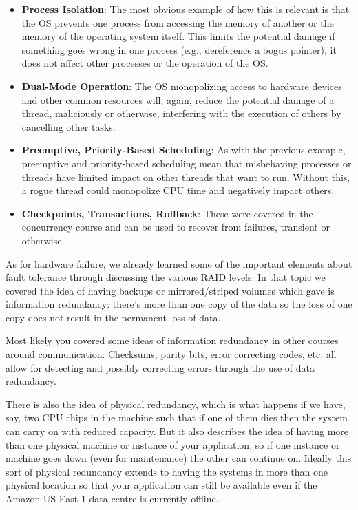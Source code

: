 \begin{itemize}

	\item \textbf{Process Isolation}: The most obvious example of how this is relevant is that the OS prevents one process from accessing the memory of another or the memory of the operating system itself. This limits the potential damage if something goes wrong in one process (e.g., dereference a bogus pointer), it does not affect other processes or the operation of the OS. 
	
	\item \textbf{Dual-Mode Operation}: The OS monopolizing access to hardware devices and other common resources will, again, reduce the potential damage of a thread, maliciously or otherwise, interfering with the execution of others by cancelling other tasks.
	
	\item \textbf{Preemptive, Priority-Based Scheduling}: As with the previous example, preemptive and priority-based scheduling mean that misbehaving processes or threads have limited impact on other threads that want to run. Without this, a rogue thread could monopolize CPU time and negatively impact others.
	
	\item \textbf{Checkpoints, Transactions, Rollback}: These were covered in the concurrency course and can be used to recover from failures, transient or otherwise. 
\end{itemize}

As for hardware failure, we already learned some of the important elements about fault tolerance through discussing the various RAID levels. In that topic we covered the idea of having backups or mirrored/striped volumes which gave is information redundancy: there's more than one copy of the data so the loss of one copy does not result in the permanent loss of data. 

Most likely you covered some ideas of information redundancy in other courses around communication. Checksums, parity bits, error correcting codes, etc. all allow for detecting and possibly correcting errors through the use of data redundancy.

There is also the idea of physical redundancy, which is what happens if we have, say, two CPU chips in the machine such that if one of them dies then the system can carry on with reduced capacity. But it also describes the idea of having more than one physical machine or instance of your application, so if one instance or machine goes down (even for maintenance) the other can continue on. Ideally this sort of physical redundancy extends to having the systems in more than one physical location so that your application can still be available even if the Amazon US East 1 data centre is currently offline.

